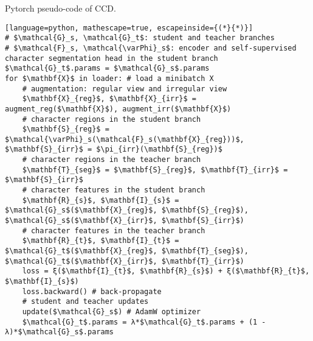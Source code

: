 \documentclass[10pt,twocolumn,letterpaper]{article}
\begin{document}
\begin{algorithm}[t]
 \caption{Pytorch pseudo-code of CCD.}
 \vspace{-0.5em}
 \label{algo:CCD}
\centering
{}
\begin{lstlisting}[language=python, mathescape=true, escapeinside={(*}{*)}]
# $\mathcal{G}_s, \mathcal{G}_t$: student and teacher branches
# $\mathcal{F}_s, \mathcal{\varPhi}_s$: encoder and self-supervised character segmentation head in the student branch
$\mathcal{G}_t$.params = $\mathcal{G}_s$.params
for $\mathbf{X}$ in loader: # load a minibatch X
    # augmentation: regular view and irregular view
    $\mathbf{X}_{reg}$, $\mathbf{X}_{irr}$ = augment_reg($\mathbf{X}$), augment_irr($\mathbf{X}$)
    # character regions in the student branch
    $\mathbf{S}_{reg}$ = $\mathcal{\varPhi}_s(\mathcal{F}_s(\mathbf{X}_{reg}))$, $\mathbf{S}_{irr}$ = $\pi_{irr}(\mathbf{S}_{reg})$
    # character regions in the teacher branch
    $\mathbf{T}_{seg}$ = $\mathbf{S}_{reg}$, $\mathbf{T}_{irr}$ = $\mathbf{S}_{irr}$
    # character features in the student branch
    $\mathbf{R}_{s}$, $\mathbf{I}_{s}$ = $\mathcal{G}_s$($\mathbf{X}_{reg}$, $\mathbf{S}_{reg}$), $\mathcal{G}_s$($\mathbf{X}_{irr}$, $\mathbf{S}_{irr}$)
    # character features in the teacher branch
    $\mathbf{R}_{t}$, $\mathbf{I}_{t}$ = $\mathcal{G}_t$($\mathbf{X}_{reg}$, $\mathbf{T}_{seg}$), $\mathcal{G}_t$($\mathbf{X}_{irr}$, $\mathbf{T}_{irr}$)
    loss = ξ($\mathbf{I}_{t}$, $\mathbf{R}_{s}$) + ξ($\mathbf{R}_{t}$, $\mathbf{I}_{s}$)
    loss.backward() # back-propagate
    # student and teacher updates
    update($\mathcal{G}_s$) # AdamW optimizer
    $\mathcal{G}_t$.params = λ*$\mathcal{G}_t$.params + (1 - λ)*$\mathcal{G}_s$.params
\end{lstlisting}
\vspace{-0.5em}
\end{algorithm}
\end{document}
